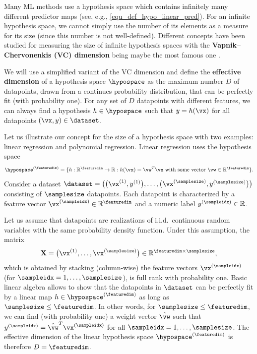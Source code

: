 \documentclass[12pt]{report}
\newcommand{\sizehypospace}{D}
\newcommand{\featurelen}{\featuredim}
\begin{document}
Many ML methods use a hypothesis space which contains 
infinitely many different predictor maps (see, e.g., \eqref{equ_def_hypo_linear_pred}). 
For an infinite hypothesis space, we cannot simply use the 
number of its elements as a measure for its size (since this number 
is not well-defined). Different concepts have been studied for 
measuring the size of infinite hypothesis spaces with the {\bf Vapnik–Chervonenkis (VC) dimension} 
being maybe the most famous one \cite{VapnikBook}. 

We will use a simplified variant of the VC dimension and define the 
{\bf effective dimension} of a hypothesis space $\hypospace$ 
as the maximum number $\sizehypospace$ of datapoints, drawn from 
a continues probability distribution, that can be perfectly fit (with probability one). 
For any set of $\sizehypospace$ datapoints with different features, we 
can always find a hypothesis $h \in \hypospace$ such that $y=h(\vx)$ 
for all datapoints $(\vx,y) \in \dataset$. 

Let us illustrate our concept for the size of a hypothesis space 
with two examples: linear regression and polynomial regression. 
Linear regression uses the hypothesis space 
$$\hypospace^{(\featuredim)} = \{ h: \mathbb{R}^{\featuredim} \rightarrow \mathbb{R}: h(\vx) = \vw^{T} \vx \mbox{ with some vector } \vw \in \mathbb{R}^{\featurelen}\}.$$ 
Consider a dataset $\dataset=\big( \big(\vx^{(1)} ,y^{(1)}\big),\ldots, \big(\vx^{(\samplesize)} ,y^{(\samplesize)}\big) \big)$ consisting of $\samplesize$ datapoints. 
Each datapoint is characterized by a feature 
vector $\vx^{(\sampleidx)} \in \mathbb{R}^{\featuredim}$ and a numeric label 
$y^{(\sampleidx)} \in \mathbb{R}$. 

Let us assume that datapoints are realizations of i.i.d.\ continuous random 
variables with the same probability density function. 
Under this assumption, the matrix 
$$\mathbf{X} = \big(\vx^{(1)},\ldots,\vx^{(\samplesize)}\big) \in \mathbb{R}^{\featuredim\times \samplesize},$$ 
which is obtained by stacking (column-wise) the feature vectors $\vx^{(\sampleidx)}$ (for $\sampleidx=1,\ldots,\samplesize$), 
is full rank with probability one. Basic linear algebra allows to show that 
the datapoints in $\dataset$ can be perfectly fit by a linear map $h \in \hypospace^{(\featuredim)}$ 
as long as $\samplesize \leq \featuredim$. In other words, for  $\samplesize \leq \featuredim$, we 
can find (with probability one) a weight vector $\hat{\vw}$ such that $y^{(\sampleidx)} = \hat{\vw}^{T} \vx^{(\sampleidx)}$ 
for all $\sampleidx=1,\ldots,\samplesize$. The effective dimension of the linear hypothesis space 
$\hypospace^{(\featuredim)}$ is therefore $\sizehypospace = \featuredim$. 
\end{document}
